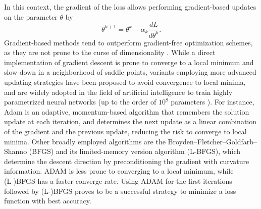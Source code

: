 In this context, the gradient of the loss allows performing gradient-based updates on the parameter $\theta$ by 
\begin{equation}
    \theta^{k+1} 
    = 
    \theta^k 
    - 
    \alpha_k 
    \frac{dL}{d\theta^k}.
\end{equation}
Gradient-based methods tend to outperform gradient-free optimization schemes, as they are not prone to the curse of dimensionality \cite{Schartau2017}. 
While a direct implementation of gradient descent is prone to converge to a local minimum and slow down in a neighborhood of saddle points, variants employing more advanced updating strategies have been proposed \cite{ruder2016overview-gradient-descent} to avoid convergence to local minima, and are widely adopted in the field of artificial intelligence to train highly parametrized neural networks (up to the order of $10^8$ parameters \cite{NIPS2017_3f5ee243}). 
For instance, Adam \cite{Kingma2014} is an adaptive, momentum-based algorithm  that remembers the solution update at each iteration, and determines the next update as a linear combination of the gradient and the previous update, reducing the risk to converge to local minima. 
Other broadly employed algorithms are the Broyden–Fletcher–Goldfarb–Shanno (BFGS) and its limited-memory version algorithm (L-BFGS), which determine the descent direction by preconditioning the gradient with curvature information. 
ADAM is less prone to converging to a local minimum, while (L-)BFGS has a faster converge rate. 
Using ADAM for the first iterations followed by (L-)BFGS proves to be a successful strategy to minimize a loss function with best accuracy. 

